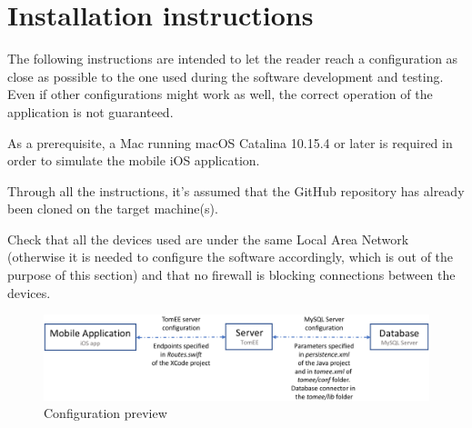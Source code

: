 \documentclass[a4paper,oneside,11pt]{book}
\begin{document}
\chapter{Installation instructions}
    The following instructions are intended to let the reader reach a configuration as close as possible to the one used during the software development and testing. Even if other configurations might work as well, the correct operation of the application is not guaranteed. \par
    As a prerequisite, a Mac running macOS Catalina 10.15.4 or later is required in order to simulate the mobile iOS application. \par
    Through all the instructions, it’s assumed that the GitHub repository has already been cloned on the target machine(s). \par
    Check that all the devices used are under the same Local Area Network (otherwise it is needed to configure the software accordingly, which is out of the purpose of this section) and that no firewall is blocking connections between the devices.
    \begin{figure}[H]
        \centering
        \includegraphics[width=\textwidth, height=\textheight, keepaspectratio]{pictures/interactions.png}
        \caption{Configuration preview}
        \label{figure:interactions}
    \end{figure}
    
\end{document}
